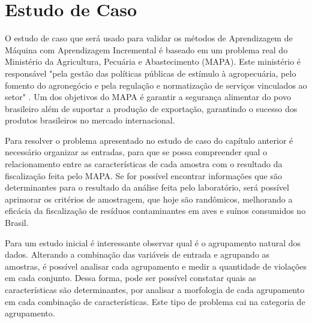 \chapter{Estudo de Caso}
O estudo de caso que será usado para validar os métodos de Aprendizagem de Máquina com Aprendizagem Incremental é baseado em um problema real do Ministério da Agricultura, Pecuária e Abastecimento (MAPA). Este ministério é responsável  "pela gestão das políticas públicas de estímulo à agropecuária, pelo fomento do agronegócio e pela regulação e normatização de serviços vinculados ao setor" \cite{mapa}. Um dos objetivos do MAPA é garantir a segurança alimentar do povo brasileiro além de suportar a produção de exportação, garantindo o sucesso dos produtos brasileiros no mercado internacional.

Para resolver o problema apresentado no estudo de caso do capítulo anterior é necessário organizar as entradas, para que se possa compreender qual o relacionamento entre as características de cada amostra com o resultado da fiscalização feita pelo MAPA. Se for possível encontrar informações que são determinantes para o resultado da análise feita pelo laboratório, será possível aprimorar os critérios de amostragem, que hoje são randômicos, melhorando a eficácia da fiscalização de resíduos contaminantes em aves e suínos consumidos no Brasil.

Para um estudo inicial é interessante observar qual é o agrupamento natural dos dados. Alterando a combinação das variáveis de entrada e agrupando as amostras, é possível analisar cada agrupamento e medir a quantidade de violações em cada conjunto. Dessa forma, pode ser possível constatar quais as características são determinantes, por analisar a morfologia de cada agrupamento em cada combinação de características. Este tipo de problema cai na categoria de agrupamento.
















